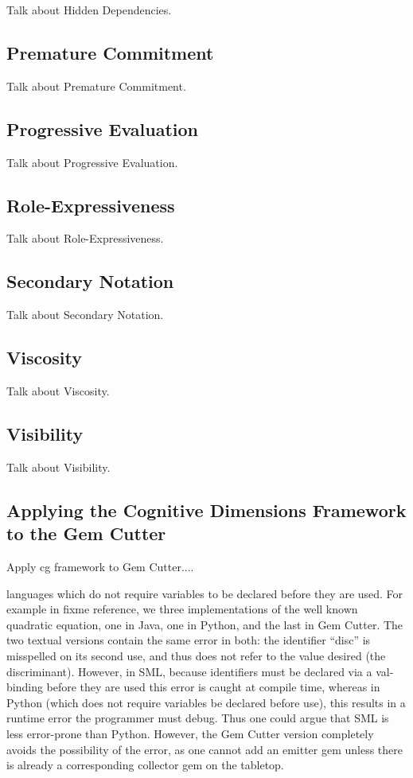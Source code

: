 Talk about Hidden Dependencies.

\subsection{Premature Commitment}
\label{prematurecommitmentoutline}

Talk about Premature Commitment.

\subsection{Progressive Evaluation}
\label{progressiveevaluationoutline}

Talk about Progressive Evaluation.

\subsection{Role-Expressiveness}
\label{roleexpressivenessoutline}

Talk about Role-Expressiveness.

\subsection{Secondary Notation}
\label{secondarynotationoutline}

Talk about Secondary Notation.

\subsection{Viscosity}
\label{viscosityoutline}

Talk about Viscosity.

\subsection{Visibility}
\label{visibilityoutline}

Talk about Visibility.

\subsection{Applying the Cognitive Dimensions Framework to the Gem Cutter}

Apply cg framework to Gem Cutter....

languages which do not require variables to be declared before they are used.  For example in fixme reference, we three implementations of the well known quadratic equation, one in Java, one in Python, and the last in Gem Cutter.  The two textual versions contain the same error in both: the identifier ``disc'' is misspelled on its second use, and thus does not refer to the value desired (the discriminant).  However, in SML, because identifiers must be declared via a val-binding before they are used this error is caught at compile time, whereas in Python (which does not require variables be declared before use), this results in a runtime error the programmer must debug.  Thus one could argue that SML is less error-prone than Python.  However, the Gem Cutter version completely avoids the possibility of the error, as one cannot add an emitter gem unless there is already a corresponding collector gem on the tabletop.



